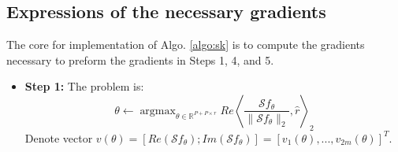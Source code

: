 \documentclass[12pt,a4paper]{article}
\DeclareMathOperator*{\argmax}{argmax}
\begin{document}
\subsection{Expressions of the necessary gradients}
The core for implementation of Algo. \ref{algo:sk} is to compute the gradients necessary to preform the gradients in Steps 1, 4, and 5. 
\begin{itemize}
    \item \textbf{Step 1:}
    The problem is:
    \begin{equation}
        \theta \xleftarrow{} \argmax_{\theta \in \mathbb{R}^{P+P\times r}} Re \left\langle
    \frac{\mathcal{S}f_\theta}{\|\mathcal{S}f_\theta\|_2}, \hat{r} \right\rangle_2
    \end{equation}
    Denote vector $v(\theta) =[Re(\mathcal{S}f_\theta) ; Im(\mathcal{S}f_\theta)] = [v_1(\theta),...,v_{2m}(\theta)]^T.$
    

\end{itemize}
\end{document}
